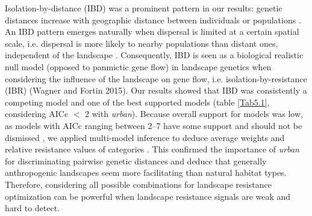 \documentclass[10pt, twoside]{book} %
\begin{document}
	Isolation-by-distance (IBD) was a prominent pattern in our results: genetic distances increase with geographic distance between individuals or populations \citep[chapter \ref{chapter4}]{batsleer2022b}. An IBD pattern emerges naturally when dispersal is limited at a certain spatial scale, i.e. dispersal is more likely to nearby populations than distant ones, independent of the landscape \citep{kimura1964}. Consequently, IBD is seen as a biological realistic null model (opposed to panmictic gene flow) in landscape genetics when considering the influence of the landscape on gene flow, i.e. isolation-by-resistance (IBR) (Wagner and Fortin 2015). Our results showed that IBD was consistently a competing model and one of the best supported models (table \ref{Tab5.1}, considering \textDelta AICc $<$ 2 with \textit{urban}). Because overall support for models was low, as models with \textDelta AICc ranging between 2--7 have some support and should not be dismissed \citep{burnham2011}, we applied multi-model inference to deduce average weights and relative resistance values of categories \citep{johnson2004}. This confirmed the importance of \textit{urban} for discriminating pairwise genetic distances and deduce that generally anthropogenic landscapes seem more facilitating than natural habitat types. Therefore, considering all possible combinations for landscape resistance optimization can be powerful when landscape resistance signals are weak and hard to detect.\\
	
\end{document}
